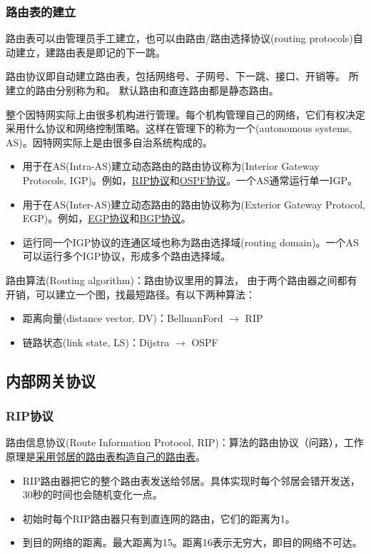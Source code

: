 \subsubsection{路由表的建立}
路由表可以由管理员手工建立，也可以由路由/路由选择协议(routing protocols)自动建立，建路由表是即记的下一跳。

路由协议即自动建立路由表，包括网络号、子网号、下一跳、接口、开销等。
所建立的路由分别称为和。
默认路由和直连路由都是静态路由。

整个因特网实际上由很多机构进行管理。每个机构管理自己的网络，它们有权决定采用什么协议和网络控制策略。这样在管理下的称为一个(autonomous systems, AS)。因特网实际上是由很多自治系统构成的。
\begin{itemize}
	\item 用于在AS(Intra-AS)建立动态路由的路由协议称为(Interior Gateway Protocols, IGP)。例如，\underline{RIP协议}和\underline{OSPF协议}。一个AS通常运行单一IGP。
	\item 用于在AS(Inter-AS)建立动态路由的路由协议称为(Exterior Gateway Protocol, EGP)。例如，\underline{EGP协议}和\underline{BGP协议}。
	\item 运行同一个IGP协议的连通区域也称为路由选择域(routing domain)。一个AS可以运行多个IGP协议，形成多个路由选择域。
\end{itemize}

路由算法(Routing algorithm)：路由协议里用的算法， 由于两个路由器之间都有开销，可以建立一个图，找最短路径。有以下两种算法：
\begin{itemize}
	\item 距离向量(distance vector, DV)：BellmanFord $\to$ RIP
	\item 链路状态(link state, LS)：Dijstra $\to$ OSPF
\end{itemize}

\subsection{内部网关协议}
\subsubsection{RIP协议}
路由信息协议(Route Information Protocol, RIP)：算法的路由协议（问路），工作原理是\underline{采用邻居的路由表构造自己的路由表}。
\begin{itemize}
	\item {}RIP路由器把它的整个路由表发送给邻居。具体实现时每个邻居会错开发送，30秒的时间也会随机变化一点。
	\item 初始时每个RIP路由器只有到直连网的路由，它们的距离为1。
	\item 到目的网络的距离。最大距离为15。距离16表示无穷大，即目的网络不可达。
\end{itemize}

